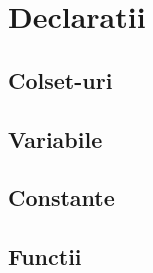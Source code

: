 
\chapter{Declaratii} 
\begin{spacing}{1.5}
\setlength{\parskip}{0.3in}

\section{Colset-uri}

\section{Variabile}

\section{Constante}

\section{Functii}

\end{spacing}
\newpage


